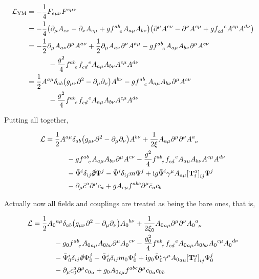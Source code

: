 \begin{align}
    \mathcal L_{\textnormal{YM}}&=-\frac14F_{e\mu\nu}F^{e\mu\nu}\nonumber\\
    &=-\frac14\qty(\partial_\mu A_{e\nu}-\partial_\nu A_{e\mu}+g\tensor{f}{^a^b_e}A_{a\mu}A_{b\nu})\qty(\partial^\mu A^{e\nu}-\partial^\nu A^{e\mu}+g\tensor{f}{_c_d^e}A^{c\mu}A^{d\nu})\nonumber\\
    &=-\frac12\partial_\mu A_{a\nu}\partial^\mu A^{a\nu}+\frac12\partial_\mu A_{a\nu}\partial^\nu A^{a\mu}-g\tensor{f}{^a^b_c}A_{a\mu}A_{b\nu}\partial^\mu A^{c\nu}\nonumber\\
    &\quad\quad\quad-\frac{g^2}{4}\tensor{f}{^a^b_e}\tensor{f}{_c_d^e}A_{a\mu}A_{b\nu}A^{c\mu}A^{d\nu}\nonumber\\
    &=\frac12A^{a\mu}\delta_{ab}\qty(g_{\mu\nu}\partial^2 -\partial_\mu\partial_\nu )A^{b\nu}-g\tensor{f}{^a^b_c}A_{a\mu}A_{b\nu}\partial^\mu A^{c\nu}\nonumber\\
    &\quad\quad\quad-\frac{g^2}{4}\tensor{f}{^a^b_e}\tensor{f}{_c_d^e}A_{a\mu}A_{b\nu}A^{c\mu}A^{d\nu}\nonumber
\end{align}

Putting all together,

\begin{align}
    \mathcal L&=\frac12A^{a\mu}\delta_{ab}\qty(g_{\mu\nu}\partial^2 -\partial_\mu\partial_\nu )A^{b\nu}+\frac{1}{2\xi} A_{a\mu}\partial^\mu\partial^\nu \tensor{A}{^a_\nu}\nonumber\\
    &\quad\quad\quad-g\tensor{f}{^a^b_c}A_{a\mu}A_{b\nu}\partial^\mu A^{c\nu}-\frac{g^2}{4}\tensor{f}{^a^b_e}\tensor{f}{_c_d^e}A_{a\mu}A_{b\nu}A^{c\mu}A^{d\nu}\nonumber\\
    &\quad\quad\quad-\bar{\Psi}^i\delta_{ij}\slashed\partial\Psi^j-\bar{\Psi}^i\delta_{ij}m\Psi^j+\im g\bar{\Psi}^i\gamma^\mu A_{a\mu}\tensor{\qty[\vb T^a_{\textnormal f}]}{_i_j}\Psi^j\nonumber\\
    &\quad\quad\quad -\partial_\mu\bar c^a\partial^\mu c_a+g A_{c\mu}\tensor{f}{^a^b^c}\partial^\mu \bar c_ac_b
\end{align}

Actually now all fields and couplings are treated as being the bare ones, that is,

\begin{align}
    \mathcal L&=\frac12{A_0}^{a\mu}\delta_{ab}\qty(g_{\mu\nu}\partial^2 -\partial_\mu\partial_\nu ){A_0}^{b\nu}+\frac{1}{2\xi_0} {A_0}_{a\mu}\partial^\mu\partial^\nu \tensor{{A_0}}{^a_\nu}\nonumber\\
    &\quad\quad\quad-g_0\tensor{f}{^a^b_c}{A_0}_{a\mu}{A_0}_{b\nu}\partial^\mu {A_0}^{c\nu}-\frac{g_0^2}{4}\tensor{f}{^a^b_e}\tensor{f}{_c_d^e}{A_0}_{a\mu}{A_0}_{b\nu}{A_0}^{c\mu}{A_0}^{d\nu}\nonumber\\
    &\quad\quad\quad-\bar{\Psi}_0^i\delta_{ij}\slashed\partial\Psi_0^j-\bar{\Psi}_0^i\delta_{ij}m_0\Psi_0^j+\im g_0\bar{\Psi}_0^i\gamma^\mu {A_0}_{a\mu}\tensor{\qty[\vb T^a_{\textnormal f}]}{_i_j}\Psi_0^j\nonumber\\
    &\quad\quad\quad -\partial_\mu\bar c_0^a\partial^\mu {c_0}_a+g_0 {A_0}_{c\mu}\tensor{f}{^a^b^c}\partial^\mu \bar {c_0}_a{c_0}_b\label{lagrangianbare1}
\end{align}

